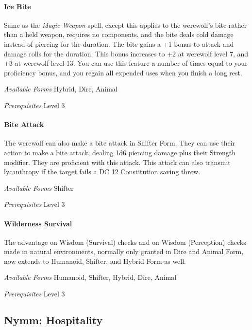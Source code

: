 \documentclass[twocolumn]{dndbook}
\begin{document}
\paragraph*{Ice Bite}
Same as the \emph{Magic Weapon} spell, except this applies to the werewolf's bite rather than a held weapon, requires no components, and the bite deals cold damage instead of piercing for the duration.
The bite gains a +1 bonus to attack and damage rolls for the duration.
This bonus increases to +2 at werewolf level 7, and +3 at werewolf level 13.
You can use this feature a number of times equal to your proficiency bonus, and you regain all expended uses when you finish a long rest.\par
\emph{Available Forms} Hybrid, Dire, Animal\par
\emph{Prerequisites} Level 3\par

\paragraph*{Bite Attack}
The werewolf can also make a bite attack in Shifter Form.
They can use their action to make a bite attack, dealing 1d6 piercing damage plus their Strength modifier.
They are proficient with this attack.
This attack can also transmit lycanthropy if the target fails a DC 12 Constitution saving throw.\par
\emph{Available Forms} Shifter\par
\emph{Prerequisites} Level 3\par

\paragraph*{Wilderness Survival}
The advantage on Wisdom (Survival) checks and on Wisdom (Perception) checks made in natural environments, normally only granted in Dire and Animal Form, now extends to Humanoid, Shifter, and Hybrid Form as well.\par
\emph{Available Forms} Humanoid, Shifter, Hybrid, Dire, Animal\par
\emph{Prerequisites} Level 3\par


\subsection*{Nymm: Hospitality}
\end{document}
